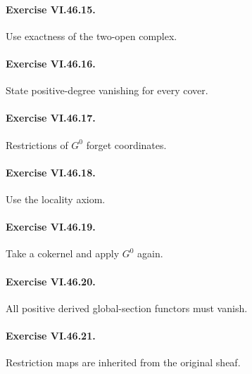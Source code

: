 \paragraph{Exercise VI.46.15.}
\begin{hint}
Use exactness of the two-open complex.
\end{hint}

\paragraph{Exercise VI.46.16.}
\begin{hint}
State positive-degree vanishing for every cover.
\end{hint}

\paragraph{Exercise VI.46.17.}
\begin{hint}
Restrictions of \(G^0\) forget coordinates.
\end{hint}

\paragraph{Exercise VI.46.18.}
\begin{hint}
Use the locality axiom.
\end{hint}

\paragraph{Exercise VI.46.19.}
\begin{hint}
Take a cokernel and apply \(G^0\) again.
\end{hint}

\paragraph{Exercise VI.46.20.}
\begin{hint}
All positive derived global-section functors must vanish.
\end{hint}

\paragraph{Exercise VI.46.21.}
\begin{hint}
Restriction maps are inherited from the original sheaf.
\end{hint}

